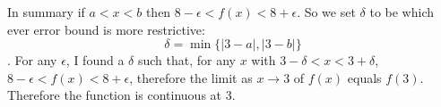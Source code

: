 {In summary if $ a < x < b$ then $8 - \epsilon < f(x) < 8 + \epsilon$. So we set $\delta$ to be which ever error bound is more restrictive: $$\delta = \min\{|3 - a|, |3 - b|\}$$. For any $\epsilon$, I found a $\delta$ such that, for any $x$ with $3 - \delta < x < 3 + \delta$, $8 - \epsilon < f(x) < 8 + \epsilon$, therefore the limit as $x \to 3$ of $ f(x)$ equals $ f(3)$. Therefore the function is continuous at 3.


}



